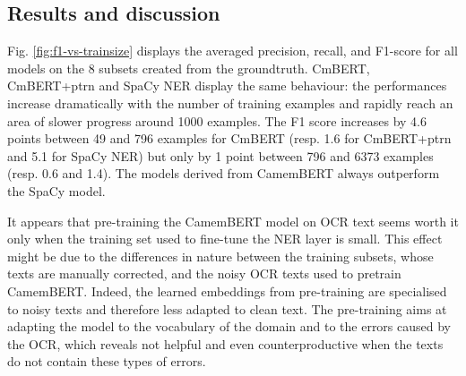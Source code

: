 


\subsection{Results and discussion}
Fig. \ref{fig:f1-vs-trainsize} displays the averaged precision, recall, and F1-score for all models on the 8 subsets created from the groundtruth.
CmBERT, CmBERT+ptrn and SpaCy NER display the same behaviour: the performances increase dramatically with the number of training examples and rapidly reach an area of slower progress around 1000 examples.
The F1 score increases by 4.6 points between 49 and 796 examples for CmBERT (resp. 1.6 for CmBERT+ptrn and 5.1 for SpaCy NER) but only by 1 point between 796 and 6373 examples (resp. 0.6 and 1.4).
The models derived from CamemBERT always outperform the SpaCy model.

It appears that pre-training the CamemBERT model on OCR text seems worth it only when the training set used to fine-tune the NER layer is small.
This effect might be due to the differences in nature between the training subsets, whose texts are manually corrected, and the noisy OCR texts used to pretrain CamemBERT.
Indeed, the learned embeddings from pre-training are specialised to noisy texts and therefore less adapted to clean text.
The pre-training aims at adapting the model to the vocabulary of the domain and to the errors caused by the OCR, which reveals not helpful and even counterproductive when the texts do not contain these types of errors.

